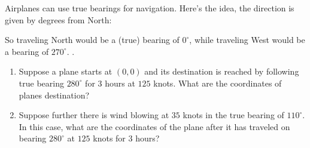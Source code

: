 \documentclass{ximera}
\begin{document}
\begin{example}[Navigation]
  Airplanes can use true bearings for navigation. Here's the idea, the direction is given by degrees from North:

\begin{center}
\upshape
\def\radius{2cm}
\def\onedegrad{1.8cm}
\def\fivedegrad{1.75cm}
\def\tendegrad{1.7cm}
\def\labelrad{1.6cm}

\end{center}

So traveling North would be a (true) bearing of $0^\circ$, while
traveling West would be a bearing of $270^\circ$.
.
\begin{enumerate}
\item Suppose a plane starts at $(0,0)$ and its destination is reached
  by following true bearing $280^\circ$ for $3$ hours at $125$ knots.
  What are the coordinates of planes destination?
\item Suppose further there is wind blowing at $35$ knots in the true
  bearing of $110^\circ$. In this case, what are the coordinates of
  the plane after it has traveled on bearing $280^\circ$ at $125$
  knots for $3$ hours?
\end{enumerate}


\end{example}
\end{document}
